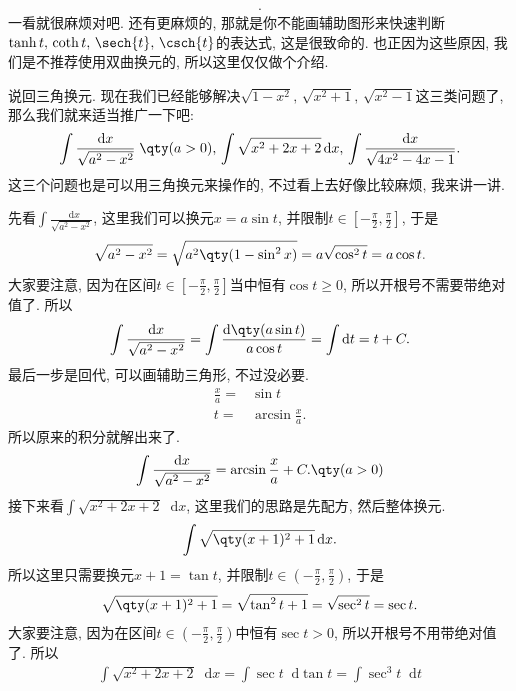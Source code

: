 \documentclass{ctexbook}
\newcommand*{\dif}{\mathop{}\!\mathrm{d}}
\begin{document}
{\begin{align*}
.\end{align*}
一看就很麻烦对吧. 还有更麻烦的, 那就是你不能画辅助图形来快速判断$\tanh{t},\,\coth{t},\,\sech{t},\,\csch{t}$的表达式, 这是很致命的. 也正因为这些原因, 我们是不推荐使用双曲换元的, 所以这里仅仅做个介绍. \par
说回三角换元. 现在我们已经能够解决$\sqrt{1-x^{2}},\,\sqrt{x^{2}+1},\,\sqrt{x^{2}-1}$这三类问题了, 那么我们就来适当推广一下吧: 
\begin{align*}
\int\frac{\dif{x}}{\sqrt{a^{2}-x^{2}}}\;\qty(a>0),\,\int\sqrt{x^{2}+2x+2}\dif{x},\,\int\frac{\dif{x}}{\sqrt{4x^{2}-4x-1}}
.\end{align*}
这三个问题也是可以用三角换元来操作的, 不过看上去好像比较麻烦, 我来讲一讲. \par
先看$\int\frac{\dif{x}}{\sqrt{a^{2}-x^{2}}}$, 这里我们可以换元$x=a\sin{t}$, 并限制$t\in\left[-\frac{\pi}{2},\frac{\pi}{2}\right]$, 于是
\begin{align*}
\sqrt{a^{2}-x^{2}}=\sqrt{a^{2}\qty(1-\sin^{2}{x})}=a\sqrt{\cos^{2}{t}}=a\cos{t}
.\end{align*}
大家要注意, 因为在区间$t\in\left[-\frac{\pi}{2},\frac{\pi}{2}\right]$当中恒有$\cos{t}\ge0$, 所以开根号不需要带绝对值了. 所以
\begin{align*}
\int\frac{\dif{x}}{\sqrt{a^{2}-x^{2}}}=\int\frac{\dif{\qty(a\sin{t})}}{a\cos{t}}=\int\dif{t}=t+C
.\end{align*}
最后一步是回代, 可以画辅助三角形, 不过没必要. 
\begin{align*}
\frac{x}{a}={}&\sin{t}\\
t={}&\arcsin{\frac{x}{a}}
.\end{align*}
所以原来的积分就解出来了. 
\begin{align*}
\int\frac{\dif{x}}{\sqrt{a^{2}-x^{2}}}=\arcsin{\frac{x}{a}}+C.\qty(a>0)
\end{align*}
接下来看$\int\sqrt{x^{2}+2x+2}\dif{x}$, 这里我们的思路是先配方, 然后整体换元. 
\begin{align*}
\int\sqrt{\qty(x+1)^{2}+1}\dif{x}
.\end{align*}
所以这里只需要换元$x+1=\tan{t}$, 并限制$t\in\left(-\frac{\pi}{2},\frac{\pi}{2}\right)$, 于是
\begin{align*}
\sqrt{\qty(x+1)^{2}+1}=\sqrt{\tan^{2}{t}+1}=\sqrt{\sec^{2}{t}}=\sec{t}
.\end{align*}
大家要注意, 因为在区间$t\in\left(-\frac{\pi}{2},\frac{\pi}{2}\right)$中恒有$\sec{t}>0$, 所以开根号不用带绝对值了. 所以
\begin{align*}
\int\sqrt{x^{2}+2x+2}\dif{x}=\int\sec{t}\dif{\tan{t}}=\int\sec^{3}{t}\dif{t}

\end{align*}}
\end{document}
